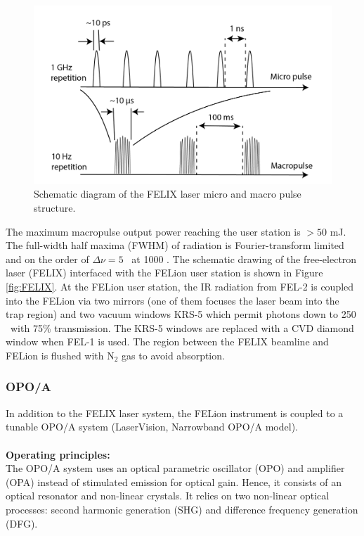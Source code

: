 \begin{figure}[!htb]
    \centering
    \includegraphics[scale=0.7]{figures/Instruments/FELIX-pulse-02.png}
    \caption{Schematic diagram of the FELIX laser micro and macro pulse structure.}
    \label{fig:FELIX-pulse}
\end{figure}

The maximum macropulse output power reaching the user station is $> 50$ mJ. The full-width half maxima (FWHM) of radiation is Fourier-transform limited and on the order of $\Delta \nu = 5$ \wn\ at 1000 \wn. The schematic drawing of the free-electron laser (FELIX) interfaced with the FELion user station is shown in Figure \ref{fig:FELIX}. At the FELion user station, the IR radiation from FEL-2 is coupled into the FELion via two mirrors (one of them focuses the laser beam into the trap region) and two vacuum windows KRS-5 which permit photons down to 250 \wn\ with 75\% transmission. The KRS-5 windows are replaced with a CVD diamond window when FEL-1 is used. The region between the FELIX beamline and FELion is flushed with N$_2$ gas to avoid absorption.

\subsubsection{OPO/A}
\label{subsec:ir:radiation-source:OPO}

In addition to the FELIX laser system, the FELion instrument is coupled to a tunable OPO/A system (LaserVision, Narrowband OPO/A model).\\
\\
\textbf{Operating principles:}\\

The OPO/A system uses an optical parametric oscillator (OPO) and amplifier (OPA) instead of stimulated emission for optical gain. Hence, it consists of an optical resonator and non-linear crystals. It relies on two non-linear optical processes: second harmonic generation (SHG) and difference frequency generation (DFG).\\

